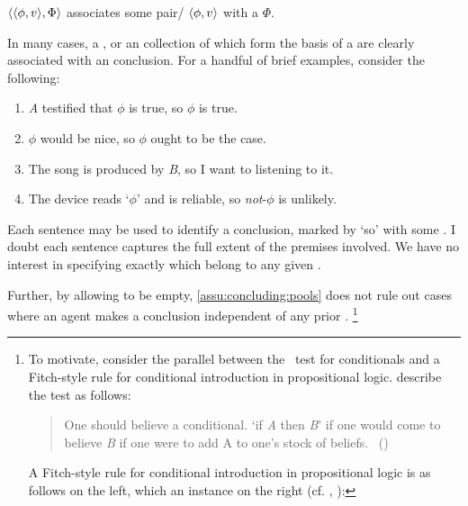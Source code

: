 \begin{note}
  \begin{notation}
  \item
    \(\langle \langle \phi, v \rangle, \Phi \rangle\) associates some pair/\evalN{} \(\langle \phi, v \rangle\) with a \pool{} \(\Phi\).
  \end{notation}

  In many cases, a \pool{}, or an collection of \evalN{} which form the basis of a \pool{} are clearly associated with an conclusion.
  For a handful of brief examples, consider the following:

  \begin{enumerate}[label=\arabic*., ref=(\arabic*), noitemsep]
  \item
    \emph{A} testified that \(\phi\) is true, so \(\phi\) is true.
  \item
    \(\phi\) would be nice, so \(\phi\) ought to be the case.
  \item
    The song is produced by \emph{B}, so I want to listening to it.
  \item
    The device reads `\(\phi\)' and is reliable, so \emph{not}-\(\phi\) is unlikely.
  \end{enumerate}

  Each sentence may be used to identify a conclusion, marked by `so' with some \pool{}.
  I doubt each sentence captures the full extent of the premises involved.
  We have no interest in specifying exactly which \evalN{} belong to any given \pool{}.

  Further, by allowing  to be empty, \autoref{assu:concluding:pools} does not rule out cases where an agent makes a conclusion independent of any prior .%
  \footnote{
    To motivate, consider the parallel between the~\citeauthor{Ramsey:1929tf} test for conditionals and a Fitch-style rule for conditional introduction in propositional logic.
    \textcite{Read:1995wf} describe the test as follows:

    \begin{quote}
      One should believe a conditional. `if \emph{A} then \emph{B}' if one would come to believe \emph{B} if one were to add A to one's stock of beliefs.%
      \mbox{ }\hfill\mbox{(\citeyear[47]{Read:1995wf})}
    \end{quote}

    A Fitch-style rule for conditional introduction in propositional logic is as follows on the left, which an instance on the right (cf. \cite[206]{Barwise:1999tu}, \cite{Pelletier:2021vp}):

}
\end{note}
